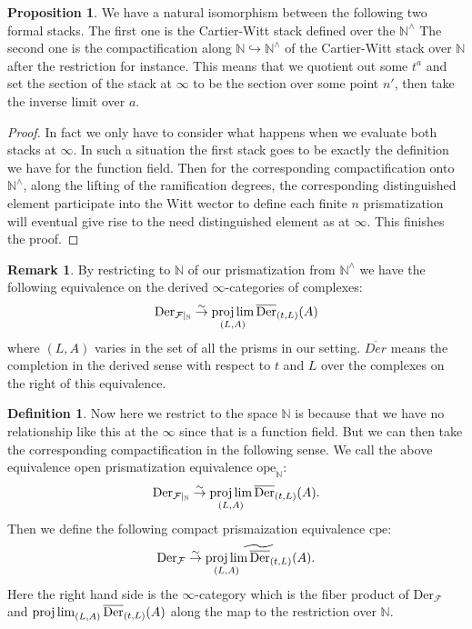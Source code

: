 \documentclass[12pt]{article}
\theoremstyle{definition}
\newtheorem{remark}{Remark}
\newtheorem{definition}{Definition}
\newtheorem{proposition}{Proposition}
\begin{document}
\begin{proposition}
We have a natural isomorphism between the following two formal stacks. The first one is the Cartier-Witt stack defined over the $\mathbb{N}^\wedge$ The second one is the compactification along $\mathbb{N}\hookrightarrow \mathbb{N}^\wedge$ of the Cartier-Witt stack over $\mathbb{N}$ after the restriction for instance. This means that we quotient out some $t^a$ and set the section of the stack at $\infty$ to be the section over some point $n'$, then take the inverse limit over $a$.
\end{proposition}

\begin{proof}
In fact we only have to consider what happens when we evaluate both stacks at $\infty$. In such a situation the first stack goes to be exactly the definition we have for the function field. Then for the corresponding compactification onto $\mathbb{N}^\wedge$, along the lifting of the ramification degrees, the corresponding distinguished element participate into the Witt wector to define each finite $n$ prismatization will eventual give rise to the need distinguished element as at $\infty$. This finishes the proof.
\end{proof}







\begin{remark}
By restricting to $\mathbb{N}$ of our prismatization from $\mathbb{N}^\wedge$ we have the following equivalence on the derived $\infty$-categories of complexes:
\begin{align}
\mathrm{Der}_{\mathcal{F}|_{\mathbb{N}}}\overset{\sim}{\rightarrow} \projlim_{(L,A)}\overline{\mathrm{Der}}_{(t,L)}(A)
\end{align}
where $(L,A)$ varies in the set of all the prisms in our setting. $\overline{Der}$ means the completion in the derived sense with respect to $t$ and $L$ over the complexes on the right of this equivalence.
\end{remark}


\begin{definition}
Now here we restrict to the space $\mathbb{N}$ is because that we have no relationship like this at the $\infty$ since that is a function field. But we can then take the corresponding compactification in the following sense. We call the above equivalence open prismatization equivalence $\mathrm{ope}_\mathbb{N}$:
\begin{align}
\mathrm{Der}_{\mathcal{F}|_{\mathbb{N}}}\overset{\sim}{\rightarrow} \projlim_{(L,A)}\overline{\mathrm{Der}}_{(t,L)}(A).
\end{align}
Then we define the following compact prismaization equivalence $\mathrm{cpe}$:
\begin{align}
\mathrm{Der}_{\mathcal{F}}\overset{\sim}{\rightarrow} \widetilde{\projlim_{(L,A)}\overline{\mathrm{Der}}_{(t,L)}(A)}.
\end{align}
Here the right hand side is the $\infty$-category which is the fiber product of $\mathrm{Der}_{\mathcal{F}}$ and $\projlim_{(L,A)}\overline{\mathrm{Der}}_{(t,L)}(A)$ along the map to the restriction over $\mathbb{N}$. 
\end{definition}
\end{document}
